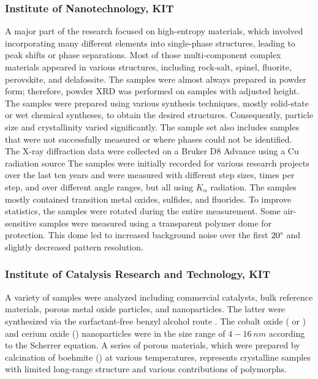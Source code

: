 \subsubsection*{Institute of Nanotechnology, KIT}

A major part of the research focused on high-entropy materials, which involved incorporating many different elements into single-phase structures, leading to peak shifts or phase separations. Most of those multi-component complex materials appeared in various structures, including rock-salt, spinel, fluorite, perovskite, and delafossite. The samples were almost always prepared in powder form; therefore, powder XRD was performed on samples with adjusted height. The samples were prepared using various synthesis techniques, mostly solid-state or wet chemical syntheses, to obtain the desired structures. Consequently, particle size and crystallinity varied significantly. The sample set also includes samples that were not successfully measured or where phases could not be identified. \\

The X-ray diffraction data were collected on a Bruker D8 Advance using a Cu radiation source  The samples were initially recorded for various research projects over the last ten years and were measured with different step sizes, times per step, and over different angle ranges, but all using  $K_\alpha$ radiation. The samples mostly contained transition metal oxides, sulfides, and fluorides. To improve statistics, the samples were rotated during the entire measurement. Some air-sensitive samples were measured using a transparent polymer dome for protection. This dome led to increased background noise over the first $20\degree$ and slightly decreased pattern resolution. \\ 


\subsubsection*{Institute of Catalysis Research and Technology, KIT}

A variety of samples were analyzed including commercial catalysts, bulk reference materials, porous metal oxide particles, and nanoparticles. The latter were synthesized via the surfactant-free benzyl alcohol route \cite{Wolf2019, Wolf2018}. The cobalt oxide ( or ) and cerium oxide () nanoparticles were in the size range of $4-16 \ \si{nm}$ according to the Scherrer equation. A series of porous  materials, which were prepared by calcination of boehmite () at various temperatures, represents crystalline samples with limited long-range structure and various contributions of  polymorphs.\\

